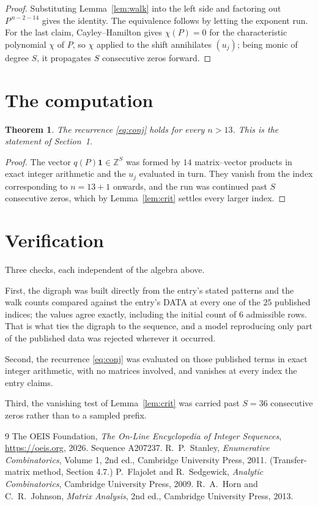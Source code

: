 \documentclass[11pt,a4paper]{article}
\theoremstyle{plain}
\newtheorem{theorem}{Theorem}
\theoremstyle{definition}
\begin{document}
\begin{proof}
Substituting Lemma~\ref{lem:walk} into the left side and factoring out
$P^{\,n-2-14}$ gives the identity. The equivalence follows by letting the exponent
run. For the last claim, Cayley--Hamilton gives $\chi(P)=0$ for the characteristic
polynomial $\chi$ of $P$, so $\chi$ applied to the shift annihilates $(u_j)$; being monic of
degree $S$, it propagates $S$ consecutive zeros forward.
\end{proof}

\section{The computation}

\begin{theorem}
The recurrence \eqref{eq:conj} holds for every $n>13$. This is the statement of
Section~1.
\end{theorem}

\begin{proof}
The vector $q(P)\mathbf{1}\in\mathbb{Z}^{S}$ was formed by $14$ matrix--vector
products in exact integer arithmetic and the $u_j$ evaluated in turn. They vanish from the
index corresponding to $n=13+1$ onwards, and the run was continued past $S$ consecutive
zeros, which by Lemma~\ref{lem:crit} settles every larger index.
\end{proof}

\section{Verification}

Three checks, each independent of the algebra above.

First, the digraph was built directly from the entry's stated patterns and the walk counts
compared against the entry's DATA at every one of the $25$ published indices; the
values agree exactly, including the initial count of $6$ admissible rows. That is
what ties the digraph to the sequence, and a model reproducing only part of the published
data was rejected wherever it occurred.

Second, the recurrence \eqref{eq:conj} was evaluated on those published terms in exact
integer arithmetic, with no matrices involved, and vanishes at every index the entry claims.

Third, the vanishing test of Lemma~\ref{lem:crit} was carried past $S=36$ consecutive
zeros rather than to a sampled prefix.

\begin{thebibliography}{9}
 The OEIS Foundation, \emph{The On-Line Encyclopedia of Integer
Sequences}, \url{https://oeis.org}, 2026. Sequence A207237.
 R.~P.~Stanley, \emph{Enumerative Combinatorics}, Volume 1, 2nd ed.,
Cambridge University Press, 2011. (Transfer-matrix method, Section 4.7.)
 P.~Flajolet and R.~Sedgewick, \emph{Analytic Combinatorics}, Cambridge
University Press, 2009.
 R.~A.~Horn and C.~R.~Johnson, \emph{Matrix Analysis}, 2nd ed., Cambridge
University Press, 2013.
\end{thebibliography}
\end{document}
